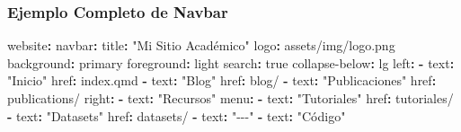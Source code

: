 \documentclass[
  doc,
  floatsintext,
  longtable,
  a4paper,
  nolmodern,
  notxfonts,
  notimes,
  12pt,
  colorlinks=true,linkcolor=blue,citecolor=blue,urlcolor=blue]{apa7}
\newenvironment{Shaded}{\begin{snugshade}}{\end{snugshade}}
\newcommand{\AttributeTok}[1]{\textcolor[rgb]{0.40,0.45,0.13}{#1}}
\newcommand{\CharTok}[1]{\textcolor[rgb]{0.13,0.47,0.30}{#1}}
\newcommand{\FunctionTok}[1]{\textcolor[rgb]{0.28,0.35,0.67}{#1}}
\newcommand{\KeywordTok}[1]{\textcolor[rgb]{0.00,0.23,0.31}{\textbf{#1}}}
\newcommand{\StringTok}[1]{\textcolor[rgb]{0.13,0.47,0.30}{#1}}
\begin{document}
\subsubsection{Ejemplo Completo de
Navbar}\label{ejemplo-completo-de-navbar}

\begin{Shaded}
\begin{Highlighting}[]
\FunctionTok{website}\KeywordTok{:}
\AttributeTok{  }\FunctionTok{navbar}\KeywordTok{:}
\AttributeTok{    }\FunctionTok{title}\KeywordTok{:}\AttributeTok{ }\StringTok{"Mi Sitio Académico"}
\AttributeTok{    }\FunctionTok{logo}\KeywordTok{:}\AttributeTok{ assets/img/logo.png}
\AttributeTok{    }\FunctionTok{background}\KeywordTok{:}\AttributeTok{ primary}
\AttributeTok{    }\FunctionTok{foreground}\KeywordTok{:}\AttributeTok{ light}
\AttributeTok{    }\FunctionTok{search}\KeywordTok{:}\AttributeTok{ }\CharTok{true}
\AttributeTok{    }\FunctionTok{collapse{-}below}\KeywordTok{:}\AttributeTok{ lg}
\AttributeTok{    }
\AttributeTok{    }\FunctionTok{left}\KeywordTok{:}
\AttributeTok{      }\KeywordTok{{-}}\AttributeTok{ }\FunctionTok{text}\KeywordTok{:}\AttributeTok{ }\StringTok{"Inicio"}
\AttributeTok{        }\FunctionTok{href}\KeywordTok{:}\AttributeTok{ index.qmd}
\AttributeTok{      }\KeywordTok{{-}}\AttributeTok{ }\FunctionTok{text}\KeywordTok{:}\AttributeTok{ }\StringTok{"Blog"}
\AttributeTok{        }\FunctionTok{href}\KeywordTok{:}\AttributeTok{ blog/}
\AttributeTok{      }\KeywordTok{{-}}\AttributeTok{ }\FunctionTok{text}\KeywordTok{:}\AttributeTok{ }\StringTok{"Publicaciones"}
\AttributeTok{        }\FunctionTok{href}\KeywordTok{:}\AttributeTok{ publications/}
\AttributeTok{        }
\AttributeTok{    }\FunctionTok{right}\KeywordTok{:}
\AttributeTok{      }\KeywordTok{{-}}\AttributeTok{ }\FunctionTok{text}\KeywordTok{:}\AttributeTok{ }\StringTok{"Recursos"}
\AttributeTok{        }\FunctionTok{menu}\KeywordTok{:}
\AttributeTok{          }\KeywordTok{{-}}\AttributeTok{ }\FunctionTok{text}\KeywordTok{:}\AttributeTok{ }\StringTok{"Tutoriales"}
\AttributeTok{            }\FunctionTok{href}\KeywordTok{:}\AttributeTok{ tutoriales/}
\AttributeTok{          }\KeywordTok{{-}}\AttributeTok{ }\FunctionTok{text}\KeywordTok{:}\AttributeTok{ }\StringTok{"Datasets"}
\AttributeTok{            }\FunctionTok{href}\KeywordTok{:}\AttributeTok{ datasets/}
\AttributeTok{          }\KeywordTok{{-}}\AttributeTok{ }\FunctionTok{text}\KeywordTok{:}\AttributeTok{ }\StringTok{"{-}{-}{-}"}
\AttributeTok{          }\KeywordTok{{-}}\AttributeTok{ }\FunctionTok{text}\KeywordTok{:}\AttributeTok{ }\StringTok{"Código"}

\end{Highlighting}
\end{Shaded}
\end{document}
